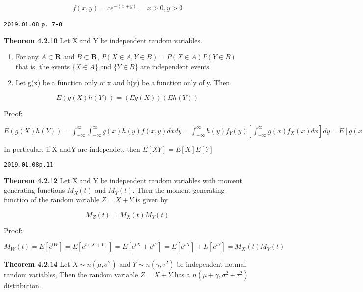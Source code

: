 \documentclass[]{tufte-book}
\begin{document}
\[f(x,y)=ce^{-(x+y)},\quad x>0, y>0\]

\texttt{2019.01.08} \texttt{p.\ 7-8}

\textbf{Theorem 4.2.10} Let X and Y be independent random variables.

\begin{enumerate}
\def\labelenumi{\alph{enumi}.}
\item
  For any \(A\subset\mathbf{R}\) and \(B\subset\mathbf{R}\),
  \(P(X\in A,Y\in B)=P(X\in A)P(Y\in B)\) that is, the events
  \{\(X\in A\)\} and \{\(Y\in B\)\} are independent events.
\item
  Let g(x) be a function only of x and h(y) be a function only of y.
  Then
\end{enumerate}

\[E(g(X)h(Y))=(Eg(X))(Eh(Y))\]

Proof:

\(E(g(X)h(Y))=\int_{-\infty}^{\infty}\int_{-\infty}^{\infty}g(x)h(y)f(x,y)dxdy=\int_{-\infty}^{\infty}h(y)f_Y(y)\left[\int_{-\infty}^{\infty}g(x)f_X(x)dx\right]dy=E[g(x)]E[h(y)]=(Eg(X))(Eh(Y))\)

In perticular, if X andY are independet, then \(E[XY]=E[X]E[Y]\)

\texttt{2019.01.08\textasciigrave{}\textasciigrave{}p.11}

\textbf{Theorem 4.2.12} Let X and Y be independent random variables with
moment generating functions \(M_X(t)\) and \(M_Y(t)\). Then the moment
generating function of the random variable \(Z=X+Y\) is given by

\[M_Z(t)=M_X(t)M_Y(t)\]

Proof:

\(M_W(t)=E[e^{tW}]=E[e^{t(X+Y)}]=E[e^{tX}+e^{tY}]=E[e^{tX}]+E[e^{tY}]=M_X(t)M_Y(t)\)

\textbf{Theorem 4.2.14} Let \(X\sim n(\mu,\sigma^2)\) and
\(Y\sim n(\gamma,\tau^2)\) be independent normal random variables, Then
the random variable \(Z=X+Y\) has a \(n(\mu+\gamma,\sigma^2+\tau^2)\)
distribution.
\end{document}
